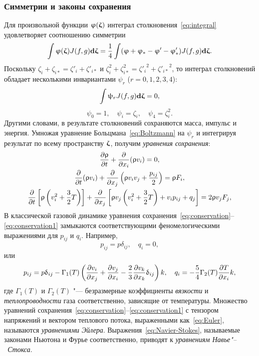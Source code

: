 
\subsubsection{Симметрии и законы сохранения}

Для произвольной функции \(\varphi(\bzeta)\) интеграл столкновения~\eqref{eq:integral}
удовлетворяет соотношению симметрии
\begin{equation}\label{eq:ci_symmetry}
    \int\varphi(\bzeta)J(f,g)\dzeta = \frac14\int(\varphi+\varphi_*-\varphi'-\varphi'_*) J(f,g)\dzeta.
\end{equation}
Поскольку \(\zeta_i+\zeta_{i*}=\zeta'_i+\zeta'_{i*}\) и \(\zeta_i^2+\zeta_{i*}^2={\zeta'_i}^2+{\zeta'_{i*}}^{\!\!2}\),
то интеграл столкновений обладает несколькими инвариантами \(\psi_r\) (\(r=0, 1, 2, 3, 4\)):
\begin{equation}\label{eq:conser_moments}
    \int \psi_r J(f,g)\dzeta = 0,
\end{equation}
\begin{equation}\label{eq:def_psi}
    \psi_0 = 1, \quad \psi_i = \zeta_i, \quad \psi_4 = \zeta_i^2.
\end{equation}
Другими словами, в результате столкновений сохраняются масса, импульс и энергия.
Умножая уравнение Больцмана~\eqref{eq:Boltzmann} на \(\psi_r\)
и интегрируя результат по всему пространству \(\bzeta\), получим \emph{уравнения сохранения}:
\begin{gather}\label{eq:conservation}
    \pder[\rho]{t} + \pder{x_i}(\rho v_i) = 0, \\
    \pder{t}(\rho v_i) + \pder{x_j}\left( \rho v_i v_j + \frac{p_{ij}}2 \right) = \rho F_i, \\
    \pder{t}\left[ \rho\left( v_i^2 + \frac32T \right) \right]
        + \pder{x_j}\left[ \rho v_j\left( v_i^2 + \frac32T \right) + v_i p_{ij} + q_j \right]
        = 2\rho v_j F_j, \label{eq:conservation1}
\end{gather}
В классической газовой динамике уравнения сохранения~\eqref{eq:conservation}--\eqref{eq:conservation1}
замыкаются соответствующими феномелогическими выражениями для \(p_{ij}\) и \(q_i\). Например,
\begin{equation}\label{eq:Euler}
    p_{ij} = p\delta_{ij}, \quad q_i = 0,
\end{equation}
или
\begin{equation}\label{eq:Navier-Stokes}
    p_{ij} = p\delta_{ij} - \Gamma_1(T)\left( \pder[v_i]{x_j} + \pder[v_j]{x_i}
        - \frac23\pder[v_k]{x_k}\delta_{ij} \right)k, \quad
    q_i = -\frac54\Gamma_2(T)\pder[T]{x_i}k,
\end{equation}
где \(\Gamma_1(T)\) и \(\Gamma_2(T)\) "--- безразмерные коэффициенты \emph{вязкости}
и \emph{теплопроводности} газа соответственно, зависящие от температуры.
Множество уравнений сохранения~\eqref{eq:conservation}--\eqref{eq:conservation1}
с тензором напряжений и вектором теплового потока, выраженными как~\eqref{eq:Euler},
называются \emph{уравнениями Эйлера}. Выражения~\eqref{eq:Navier-Stokes},
называемые законами Ньютона и Фурье соответственно,
приводят к \emph{уравнениям Навье"--~Стокса}.

